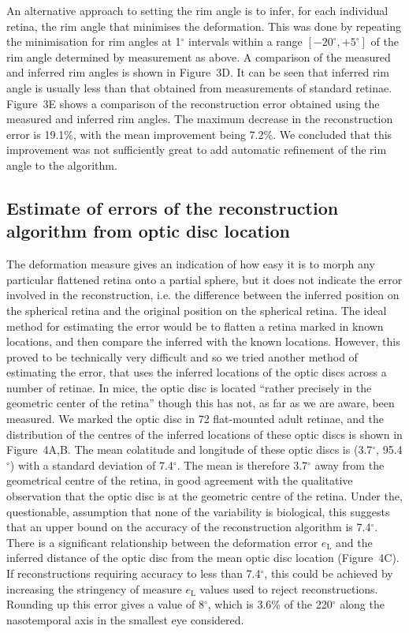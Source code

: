 \documentclass[10pt]{article}
\newcounter{Figure}
\begin{document}
An alternative approach to setting the rim angle is to infer, for each
individual retina, the rim angle that minimises the deformation. This
was done by repeating the minimisation for rim angles at 1$^{\circ}$
intervals within a range  $[-20^{\circ },+5^{\circ }]$ of the rim
angle determined by measurement as above. A comparison of the
measured and inferred rim angles  is shown in Figure~3D. It can be
seen that inferred rim angle is usually less than that obtained from
measurements of standard retinae. Figure~3E shows a comparison of the
 reconstruction error obtained using the measured and inferred rim
angles. The maximum decrease in the reconstruction error is 19.1\%,
with the mean improvement being 7.2\%. We concluded that this
improvement was not sufficiently great to add automatic refinement of
the rim angle to the algorithm.

\subsection*{Estimate of errors of the reconstruction algorithm from
optic disc location}
The deformation measure gives an indication of how easy it is to morph
any particular flattened retina onto a partial sphere, but it does
not indicate the error involved in the reconstruction, i.e. the
difference between the inferred position on the spherical retina and
the original position on the spherical retina. The ideal method for
estimating the error would be to flatten a retina marked in known
locations, and then compare the inferred with the known locations.
However, this proved to be technically very difficult and so we tried
another method of estimating the error, that uses the inferred
locations of the optic discs across a number of retinae. In mice, the
optic disc is located ``rather precisely in the geometric center of
the retina'' \cite{DragerOlsen1981} though this has not, as far as
we are aware, been measured. We marked the optic disc in 72 
flat-mounted adult retinae, and the distribution of the centres of
the inferred locations of these optic discs is shown in Figure~4A,B.
The mean colatitude and longitude of these optic discs is (3.7$^{\circ}$,
95.4$^{\circ}$) with a standard deviation of 7.4$^{\circ}$. The mean is
therefore 3.7$^{\circ}$ away from the geometrical centre of the retina,
in good agreement with the qualitative observation that the optic
disc is at the geometric centre of the retina. Under the,
questionable, assumption that none of the variability is biological,
this suggests that an upper bound on the accuracy of the
reconstruction algorithm is 7.4$^{\circ}$. There is a significant
relationship between the deformation error
$e_\mathrm{L}$ and the inferred distance of the optic
disc from the mean optic disc location (Figure~4C). If
reconstructions requiring accuracy to less than 7.4$^{\circ}$, this could
be achieved by increasing the stringency of measure
$e_\mathrm{L}$ values used to reject reconstructions.
Rounding up this error gives a value of 8$^{\circ}$, which is 3.6\% of
the 220$^{\circ}$ along the nasotemporal axis in the smallest eye
considered.
\end{document}
